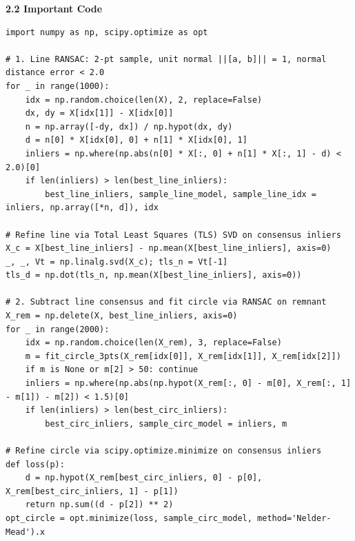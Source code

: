 \documentclass[10pt]{article}
\begin{document}
	\vspace{0.08cm}
	\noindent\textbf{2.2 Important Code}
	\vspace{-0.15cm}
\begin{lstlisting}
import numpy as np, scipy.optimize as opt

# 1. Line RANSAC: 2-pt sample, unit normal ||[a, b]|| = 1, normal distance error < 2.0
for _ in range(1000):
    idx = np.random.choice(len(X), 2, replace=False)
    dx, dy = X[idx[1]] - X[idx[0]]
    n = np.array([-dy, dx]) / np.hypot(dx, dy)
    d = n[0] * X[idx[0], 0] + n[1] * X[idx[0], 1]
    inliers = np.where(np.abs(n[0] * X[:, 0] + n[1] * X[:, 1] - d) < 2.0)[0]
    if len(inliers) > len(best_line_inliers):
        best_line_inliers, sample_line_model, sample_line_idx = inliers, np.array([*n, d]), idx

# Refine line via Total Least Squares (TLS) SVD on consensus inliers
X_c = X[best_line_inliers] - np.mean(X[best_line_inliers], axis=0)
_, _, Vt = np.linalg.svd(X_c); tls_n = Vt[-1]
tls_d = np.dot(tls_n, np.mean(X[best_line_inliers], axis=0))

# 2. Subtract line consensus and fit circle via RANSAC on remnant
X_rem = np.delete(X, best_line_inliers, axis=0)
for _ in range(2000):
    idx = np.random.choice(len(X_rem), 3, replace=False)
    m = fit_circle_3pts(X_rem[idx[0]], X_rem[idx[1]], X_rem[idx[2]])
    if m is None or m[2] > 50: continue
    inliers = np.where(np.abs(np.hypot(X_rem[:, 0] - m[0], X_rem[:, 1] - m[1]) - m[2]) < 1.5)[0]
    if len(inliers) > len(best_circ_inliers):
        best_circ_inliers, sample_circ_model = inliers, m

# Refine circle via scipy.optimize.minimize on consensus inliers
def loss(p):
    d = np.hypot(X_rem[best_circ_inliers, 0] - p[0], X_rem[best_circ_inliers, 1] - p[1])
    return np.sum((d - p[2]) ** 2)
opt_circle = opt.minimize(loss, sample_circ_model, method='Nelder-Mead').x
\end{lstlisting}
	\vspace{-0.2cm}
\end{document}
